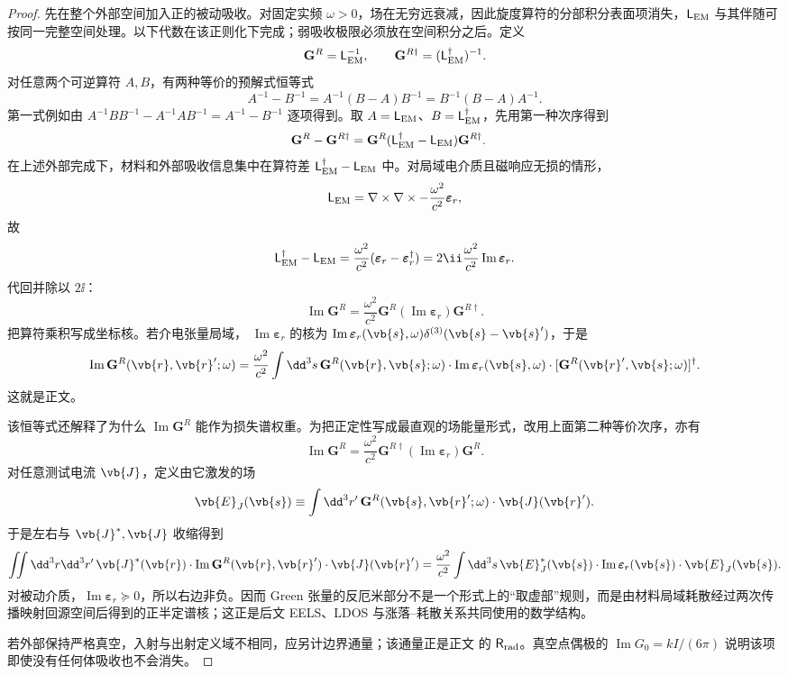 \begin{proof}
先在整个外部空间加入正的被动吸收。对固定实频 $\omega>0$，场在无穷远衰减，因此旋度算符的分部积分表面项消失，$\mathsf L_{\rm EM}$ 与其伴随可按同一完整空间处理。以下代数在该正则化下完成；弱吸收极限必须放在空间积分之后。定义
\[
\mathbf G^R=\mathsf L_{\rm EM}^{-1},
\qquad
\mathbf G^{R\dagger}=(\mathsf L_{\rm EM}^{\dagger})^{-1}.
\]
对任意两个可逆算符 $A,B$，有两种等价的预解式恒等式
\[
A^{-1}-B^{-1}
=A^{-1}(B-A)B^{-1}
=B^{-1}(B-A)A^{-1}.
\]
第一式例如由
$A^{-1}BB^{-1}-A^{-1}AB^{-1}=A^{-1}-B^{-1}$ 逐项得到。取
$A=\mathsf L_{\rm EM}$、$B=\mathsf L_{\rm EM}^{\dagger}$，先用第一种次序得到
\begin{align*}
\mathbf G^R-\mathbf G^{R\dagger}
&=\mathbf G^R
(\mathsf L_{\rm EM}^{\dagger}-\mathsf L_{\rm EM})
\mathbf G^{R\dagger}.
\end{align*}
在上述外部完成下，材料和外部吸收信息集中在算符差 $\mathsf L_{\rm EM}^{\dagger}-\mathsf L_{\rm EM}$ 中。对局域电介质且磁响应无损的情形，
\[
\mathsf L_{\rm EM}
=\nabla\times\nabla\times
-\frac{\omega^2}{c^2}\boldsymbol\varepsilon_r,
\]
故
\[
\mathsf L_{\rm EM}^{\dagger}-\mathsf L_{\rm EM}
=\frac{\omega^2}{c^2}
(\boldsymbol\varepsilon_r-\boldsymbol\varepsilon_r^{\dagger})
=2\ii\frac{\omega^2}{c^2}
\operatorname{Im}\boldsymbol\varepsilon_r.
\]
代回并除以 $2\ii$：
\[
\operatorname{Im}\mathbf G^R
=\frac{\omega^2}{c^2}
\mathbf G^R
(\operatorname{Im}\boldsymbol\varepsilon_r)
\mathbf G^{R\dagger}.
\]
把算符乘积写成坐标核。若介电张量局域，
$\operatorname{Im}\boldsymbol\varepsilon_r$ 的核为
$\operatorname{Im}\boldsymbol\varepsilon_r(\vb{s},\omega)
\delta^{(3)}(\vb{s}-\vb{s}')$，于是
\[
{
\operatorname{Im}\mathbf G^R(\vb{r},\vb{r}';\omega)
=\frac{\omega^2}{c^2}\int\dd^3s\,
\mathbf G^R(\vb{r},\vb{s};\omega)
\cdot\operatorname{Im}\boldsymbol\varepsilon_r(\vb{s},\omega)
\cdot[\mathbf G^R(\vb{r}',\vb{s};\omega)]^\dagger}.
\]
这就是正文。

该恒等式还解释了为什么 $\operatorname{Im}\mathbf G^R$ 能作为损失谱权重。为把正定性写成最直观的场能量形式，改用上面第二种等价次序，亦有
\[
\operatorname{Im}\mathbf G^R
=\frac{\omega^2}{c^2}
\mathbf G^{R\dagger}
(\operatorname{Im}\boldsymbol\varepsilon_r)
\mathbf G^R.
\]
对任意测试电流 $\vb{J}$，定义由它激发的场
\[
\vb{E}_J(\vb{s})
\equiv\int\dd^3r'\,\mathbf G^R(\vb{s},\vb{r}';\omega)\cdot\vb{J}(\vb{r}').
\]
于是左右与 $\vb{J}^*,\vb{J}$ 收缩得到
\[
\iint\dd^3r\dd^3r'\,
\vb{J}^*(\vb{r})\cdot\operatorname{Im}\mathbf G^R(\vb{r},\vb{r}')\cdot\vb{J}(\vb{r}')
=\frac{\omega^2}{c^2}\int\dd^3s\,
\vb{E}_J^*(\vb{s})\cdot
\operatorname{Im}\boldsymbol\varepsilon_r(\vb{s})\cdot\vb{E}_J(\vb{s}).
\]
对被动介质，$\operatorname{Im}\boldsymbol\varepsilon_r\succeq0$，所以右边非负。因而 Green 张量的反厄米部分不是一个形式上的“取虚部”规则，而是由材料局域耗散经过两次传播映射回源空间后得到的正半定谱核；这正是后文 EELS、LDOS 与涨落--耗散关系共同使用的数学结构。


若外部保持严格真空，入射与出射定义域不相同，应另计边界通量；该通量正是正文 的 $\mathsf R_{\rm rad}$。真空点偶极的 $\operatorname{Im}G_0=kI/(6\pi)$ 说明该项即使没有任何体吸收也不会消失。
\end{proof}
